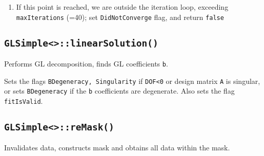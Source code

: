 \documentclass[useAMS,usenatbib,usegraphicx]{mn2e}
\begin{document}
\begin{enumerate}
\begin{enumerate}
{\tt linearSolution()}; if ({\tt !fitIsValid}), return {\tt false}
  \item {\tt Mnow = Mtests()};  {\tt Msq = Mnow*Mnow}
  \item Calculate the actual {\tt gainFactor = (bestMsq - Msq) / expectedDMsq} relative to the 
expected
  \item If there was improvement ({\tt gainFactor > 0.})
    \begin{itemize}
      \item Update the best point: {\tt bestE = tryE}, {\tt bestMsq = Msq}
      \item Save the function and Hessian {\tt f = Mnow, J=dMdE(xyscale)}
{\bf [{\tt xyscale} needs to be updated?]}
      \item if ({\tt dE * dE < tolerance * tolerance}), success!  
Check whether the fit finished with a good mask fit (if not, set the {\tt MaskMismatch} flag);
set {\tt isSolved=true} and return {\tt true}
    \end{itemize}
  \item Adjust the {\tt trustRadius}: if ({\tt gainFactor < 0.25}), shrink {\tt trustRadius *= 0.5};
else if ({\tt gainFactor > 0.75}) increase {\tt trustRadius = MAX(trustRadius, 3.*sqrt(dE*dE))},
but only up to {\tt INITIAL\_TRUST\_RADIUS}
  \item Abort if trust radius becomes too small, {\tt trustRadius < MINIMUM\_TRUST\_RADIUS} (=0.03),
set {\tt DidNotConverge} flag, and return {\tt false}
\end{enumerate}
\item If this point is reached, we are outside the iteration loop, exceeding 
{\tt maxIterations} (=40); set {\tt DidNotConverge} flag, and return {\tt false}
\end{enumerate}


\subsection{\texttt{GLSimple<>::linearSolution()}}
Performs GL decomposition, finds GL coefficients {\tt b}.  

Sets the flags {\tt BDegeneracy, Singularity} if {\tt DOF<0} or design matrix {\tt A} is 
singular, or sets {\tt BDegeneracy} if the {\tt b} coefficients are degenerate.
Also sets the flag {\tt fitIsValid}.

\subsection{\texttt{GLSimple<>::reMask()}}
Invalidates data, constructs mask and obtains all data within the mask.
\end{document}
